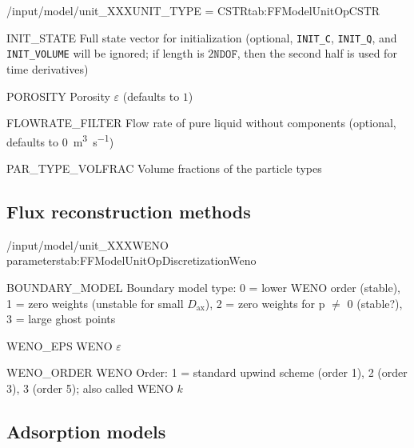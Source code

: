 \begin{condsubgroup}{/input/model/unit\_XXX}{UNIT\_TYPE = CSTR}{tab:FFModelUnitOpCSTR}
\begin{dataset}[unit=various,type=double,range={$\mathds{R}$},length={\texttt{NDOF} / $2\texttt{NDOF}$}]{INIT\_STATE}
    Full state vector for initialization (optional, \texttt{INIT\_C}, \texttt{INIT\_Q}, and \texttt{INIT\_VOLUME} will be ignored; if length is $2\texttt{NDOF}$, then the second half is used for time derivatives)
  \end{dataset}
  \begin{dataset}[unit=--,type=double,range={$[0,1]$},length={1}]{POROSITY}
    Porosity $\varepsilon$ (defaults to $1$)
  \end{dataset}
  \begin{dataset}[unit=\si{\cubic\metre\per\second},type=double,range={$\geq 0$},length={1 / \texttt{NSEC}}]{FLOWRATE\_FILTER}
    Flow rate of pure liquid without components (optional, defaults to \SI{0}{\cubic\metre\per\second})
  \end{dataset}
  \begin{dataset}[unit=--,type=double,range={$[0,1]$},length={\texttt{NPARTYPE}}]{PAR\_TYPE\_VOLFRAC}
    Volume fractions of the particle types
  \end{dataset}
\end{condsubgroup}

\subsection{Flux reconstruction methods}

\begin{subgroup}{/input/model/unit\_XXX}{WENO parameters}{tab:FFModelUnitOpDiscretizationWeno}
  \begin{dataset}[type=int,range={$\{ 0,1,2,3 \}$},length=1]{BOUNDARY\_MODEL}
    Boundary model type: 0 = lower WENO order (stable), 1 = zero weights (unstable for small $D_{\mathrm{ax}}$), 2 = zero weights for p $\neq$ 0 (stable?), 3 = large ghost points
  \end{dataset}
  \begin{dataset}[type=double,range={$\geq 0$},length=1]{WENO\_EPS}
    WENO $\varepsilon$
  \end{dataset}
  \begin{dataset}[type=int,range={$\{ 1,2,3 \}$},length=1]{WENO\_ORDER}
    WENO Order: 1 = standard upwind scheme (order 1), 2 (order 3), 3 (order 5); also called WENO $k$
  \end{dataset}
\end{subgroup}

\subsection{Adsorption models}\label{sec:FFAdsorption}


